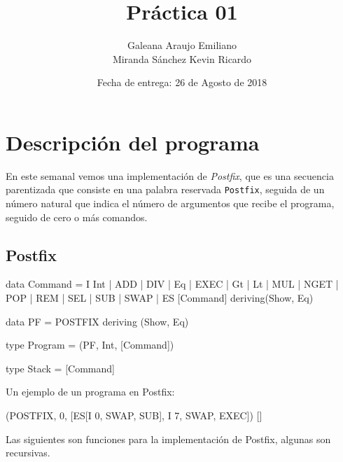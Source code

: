 \documentclass[spanish,12pt,letterpaper]{article}
\title{Práctica 01}
\author{Galeana Araujo Emiliano\\
Miranda Sánchez Kevin Ricardo}
\affil{Facultad de Ciencias, UNAM}
\date{Fecha de entrega: 26 de Agosto de 2018}
\begin{document}
\maketitle

\section{Descripción del programa}
En este semanal vemos una implementación de \textit{Postfix}, que es una
secuencia parentizada que consiste en una palabra reservada \texttt{Postfix},
seguida de un número natural que indica el número de argumentos que recibe el
programa, seguido de cero o más comandos.
\subsection{Postfix}

\begin{code}
  data Command = I Int | ADD | DIV | Eq | EXEC | Gt | Lt 
                 | MUL | NGET | POP | REM | SEL | SUB | SWAP
                 | ES [Command] deriving(Show, Eq)
\end{code}
\begin{code}
  data PF = POSTFIX deriving (Show, Eq)
\end{code}
\begin{code}
  type Program = (PF, Int, [Command])
\end{code}
\begin{code}
  type Stack = [Command]
\end{code}


Un ejemplo de un programa en Postfix:
\begin{code}
  (POSTFIX, 0, [ES[I 0, SWAP, SUB], I 7, SWAP, EXEC]) []
\end{code}

Las siguientes son funciones para la implementación de Postfix, algunas son recursivas.
\end{document}
